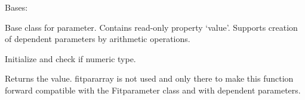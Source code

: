 \documentclass[letterpaper,10pt,english]{sphinxmanual}
\begin{document}
\begin{fulllineitems}
\label{\detokenize{modules-api/parameters:Parameters.Parameter}}
Bases: 

Base class for parameter. Contains read-only property ‘value’. Supports creation of dependent parameters by arithmetic operations.

\begin{fulllineitems}
\label{\detokenize{modules-api/parameters:Parameters.Parameter.__init__}}
Initialize and check if numeric type.

\end{fulllineitems}


\begin{fulllineitems}
\label{\detokenize{modules-api/parameters:Parameters.Parameter.getValue}}
Returns the value. fitpararray is not used and only there to make this function forward compatible with the Fitparameter class and with dependent parameters.

\end{fulllineitems}


\end{fulllineitems}

\end{document}
